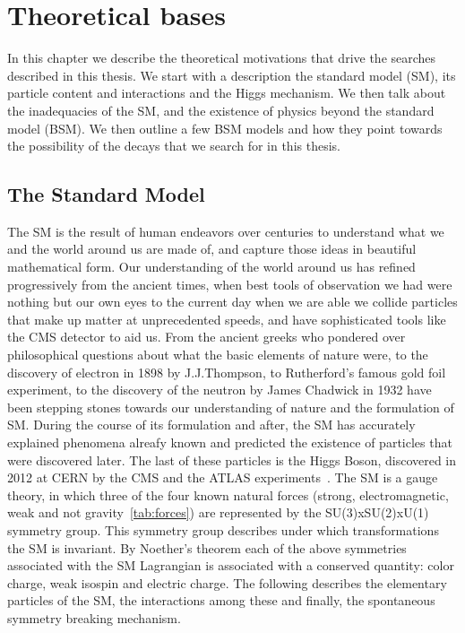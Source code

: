 
%
%

\chapter{Theoretical bases}
\label{chap:theory}
In this chapter we describe the theoretical motivations that drive the searches described in this thesis. We start with a description  the standard model (SM), its particle content and interactions and the Higgs mechanism. We then talk about the inadequacies of the SM, and the existence of physics beyond the standard model (BSM). We then outline a few BSM models and how they point towards the possibility of the decays that we search for in this thesis.  

\section{The Standard Model }
\label{sec:SM}
The SM is the result of human endeavors over centuries to understand what we and the world around us are made of, and capture those ideas in beautiful mathematical form. Our understanding of the world around us has refined progressively from the ancient times, when best tools of observation we had were nothing but our own eyes to the current day when we are able we collide particles that make up matter at unprecedented speeds, and have sophisticated tools like the CMS detector to aid us. From the ancient greeks who pondered over philosophical questions about what the basic elements of nature were, to the discovery of electron in 1898 by J.J.Thompson, to Rutherford's famous gold foil experiment, to the discovery of the neutron by James Chadwick in 1932 have been stepping stones towards our understanding of nature and the formulation of SM. During the course of its formulation and after, the SM has accurately explained phenomena alreafy known and  predicted the existence of particles that were discovered later. The last of these particles is the Higgs Boson, discovered in 2012 at CERN by the CMS and the ATLAS experiments~\cite{Aad:2012tfa, Chatrchyan:2012ufa, Chatrchyan:2013lba}. The SM is a gauge theory, in which three of the four known natural forces (strong, electromagnetic, weak and not gravity~\ref{tab:forces}) are represented by the SU(3)xSU(2)xU(1) symmetry group. This symmetry group describes under which transformations the SM is invariant. By Noether's theorem each of the above symmetries associated with the SM Lagrangian is associated with a conserved quantity: color charge, weak isospin and electric charge. The following describes the elementary particles of the SM, the interactions among these and finally, the spontaneous symmetry breaking mechanism.

